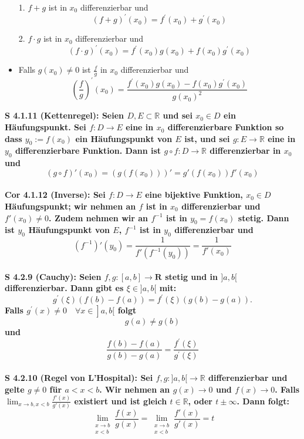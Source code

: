 \documentclass[7pt,landscape, margin = 0.1mm]{article}
\newcommand{\COR}[2]{\color{chaptercolor}\bf{Cor #1}:\color{black}    \hspace{0.2cm} #2 \\}
\newcommand{\SA}[2]{\color{chaptercolor}\bf{S #1}:\color{black}    \hspace{0.2cm} #2 \\}
\begin{document}
\begin{multicols}{4}
\begin{flushleft}
{\begin{itemize}
\item[1.]  $f+g$ ist in $x_0$ differenzierbar und $$ (f+g)^{\prime}\left(x_0\right)=f^{\prime}\left(x_0\right)+g^{\prime}\left(x_0\right) $$
\item[2.] $f \cdot g$ ist in $x_0$ differenzierbar und
     $$ (f \cdot g)^{\prime}\left(x_0\right)=f^{\prime}\left(x_0\right) g\left(x_0\right)+f\left(x_0\right) g^{\prime}\left(x_0\right) $$
\item[3.}] Falls $g\left(x_0\right) \neq 0$ ist $\frac{f}{g}$ in $x_0$ differenzierbar und
     $$ \left(\frac{f}{g}\right)^{\prime}\left(x_0\right)=\frac{f^{\prime}\left(x_0\right) g\left(x_0\right)-f\left(x_0\right) g^{\prime}\left(x_0\right)}{g\left(x_0\right)^2} $$
\end{itemize}}
\SA{4.1.11 (Kettenregel)}{ Seien $D,E \subset \mathbb{R}$ und sei $x_0 \in D$ ein Häufungspunkt. Sei $f:D \longrightarrow E$ eine in $x_0$ differenzierbare Funktion so dass $y_0 := f(x_0)$ ein Häufungspunkt von $E$ ist, und sei $g: E \longrightarrow \mathbb{R}$ eine in $y_0$ differenzierbare Funktion. Dann ist $g \circ f: D \longrightarrow \mathbb{R}$ differenzierbar in $x_0$ und
$$ (g\circ f)' (x_0) = \left(g(f(x_0))\right)'=g'(f(x_0))f'(x_0) $$}
\COR{4.1.12 (Inverse)}{Sei $f: D \longrightarrow E$ eine bijektive Funktion, $x_0 \in D$ Häufungspunkt; wir nehmen an $f$ ist in $x_0$ differenzierbar und $f'(x_0)\neq 0$. Zudem nehmen wir an $f^{-1}$ ist in $y_0 = f(x_0)$ stetig. Dann ist $y_0$ Häufungspunkt von $E$, $f^{-1}$ ist in $y_0$ differenzierbar und
$$ \left(f^{-1}\right)'(y_0) = \frac{1}{f'(f^{-1}(y_0))}=\frac{1}{f'(x_0)} $$}
\SA{4.2.9 (Cauchy)}{Seien $f, g:[a, b] \longrightarrow \mathbf{R}$ stetig und in $] a, b[$ differenzierbar. Dann gibt es $\xi \in] a, b[$ mit:
$$ g^{\prime}(\xi)(f(b)-f(a))=f^{\prime}(\xi)(g(b)-g(a)) . $$
Falls $\left.g^{\prime}(x) \neq 0 \quad \forall x \in\right] a, b[$ folgt
$$ g(a) \neq g(b) $$
und
$$ \frac{f(b)-f(a)}{g(b)-g(a)}=\frac{f^{\prime}(\xi)}{g^{\prime}(\xi)} $$
}
\SA{\colorbox{yellow!30}{4.2.10 (Regel von L'Hospital)}}{Sei $f,g: ]a,b[ \longrightarrow \mathbb{R}$ differenzierbar und gelte $g\neq 0$ für $a<x<b$. Wir nehmen an $g(x) \longrightarrow 0$ und $f(x) \longrightarrow 0$. Falls $\lim_{x \to b,x<b} \frac{f'(x)}{g'(x)}$ existiert und ist gleich $t \in \mathbb{R}$, oder $t \pm \infty$. Dann folgt:
$$ \lim_{\begin{smallmatrix} x\to b\\x<b\end{smallmatrix}} \frac{f(x)}{g(x)}= \lim_{\begin{smallmatrix} x\to b\\x<b \end{smallmatrix}} \frac{f'(x)}{g'(x)} = t $$}


\end{flushleft}
\end{multicols}
\end{document}
